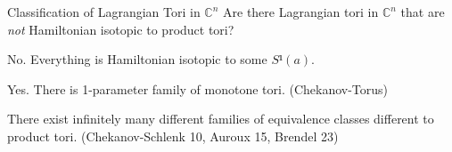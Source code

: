 \documentclass[aspectratio=169,handout]{beamer}
\begin{document}
\begin{frame}{Classification of Lagrangian Tori in $ℂ^n$}
  Are there Lagrangian tori in $ℂ^n$ that are \emph{not} Hamiltonian isotopic to product tori?

  \begin{description}
    \item<2->[$ℂ$] No. Everything is Hamiltonian isotopic to some $S¹(a)$.
    
    \item<3->[$ℂ²$] Yes. There is 1-parameter family of monotone tori. (Chekanov-Torus)
    
    \item<4->[$C^n, n ≥ 3$] There exist infinitely many different families of equivalence classes different to product tori. (Chekanov-Schlenk 10, Auroux 15, Brendel 23)
    
  \end{description}
\end{frame}
\end{document}
